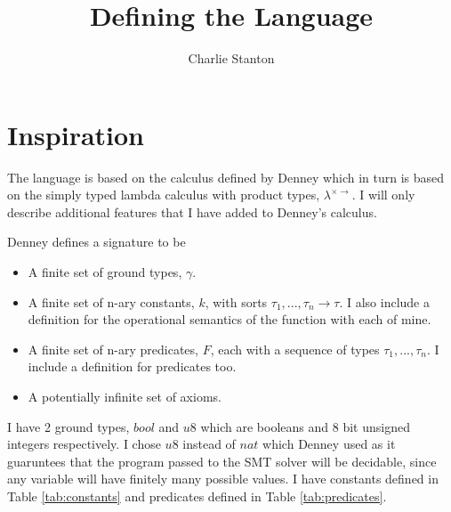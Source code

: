 \documentclass[12pt,a4paper,titlepage]{article}
\title{Defining the Language}
\author{Charlie Stanton}
\begin{document}
    \maketitle

    \section{Inspiration}
    The language is based on the calculus defined by Denney \cite{denney98}
    which in turn is based on the simply typed lambda calculus with product types, $\lambda^{\times \rightarrow}$.
    I will only describe additional features that I have added to Denney's calculus.

    Denney defines a signature to be
    \begin{itemize}
        \item A finite set of ground types, $\gamma$.
        \item A finite set of n-ary constants, $k$, with sorts $\tau_1, ..., \tau_n \rightarrow \tau$. I also include a definition for the operational semantics of the function with each of mine.
        \item A finite set of n-ary predicates, $F$, each with a sequence of types $\tau_1, ..., \tau_n$. I include a definition for predicates too.
        \item A potentially infinite set of axioms.
    \end{itemize}

    I have 2 ground types, $bool$ and $u8$ which are booleans and 8 bit unsigned integers respectively.
    I chose $u8$ instead of $nat$ which Denney used as it guaruntees that the program passed to the SMT solver
    will be decidable, since any variable will have finitely many possible values.
    I have constants defined in Table \ref{tab:constants}
    and predicates defined in Table \ref{tab:predicates}.
\end{document}
